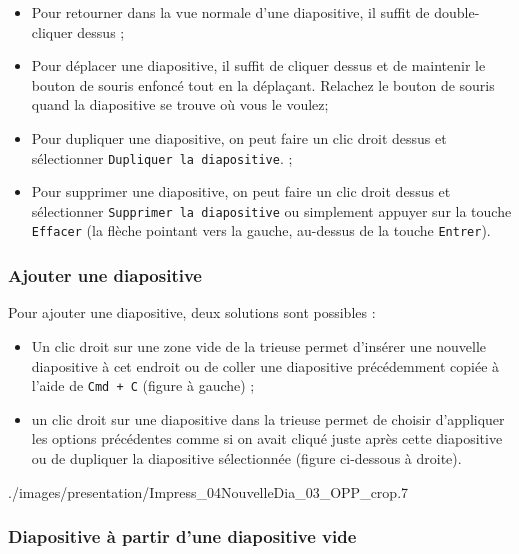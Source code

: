 
\begin{itemize}
	\item Pour retourner dans la vue normale d'une diapositive, il suffit de double-cliquer dessus ;
	\item Pour déplacer une diapositive, il suffit de cliquer dessus et de maintenir le bouton de souris enfoncé tout en la déplaçant. Relachez le bouton de souris quand la diapositive se trouve où vous le voulez;
	\item Pour dupliquer une diapositive, on peut faire un clic droit dessus et sélectionner \texttt{Dupliquer la diapositive}. ;
	\item Pour supprimer une diapositive, on peut faire un clic droit dessus et sélectionner \texttt{Supprimer la diapositive} ou simplement appuyer sur la touche \texttt{Effacer} (la flèche pointant vers la gauche, au-dessus de la touche \texttt{Entrer}).
\end{itemize}




\subsubsection{Ajouter une diapositive}\label{Presentation1nouvelleDiap}

Pour ajouter une diapositive, deux solutions sont possibles :

\begin{itemize}
\item Un clic droit sur une zone vide de la trieuse permet d'insérer une nouvelle diapositive à cet endroit ou de coller une diapositive précédemment copiée à l'aide de \texttt{Cmd + C} (figure à gauche) ; 
\item un clic droit sur une diapositive dans la trieuse permet de choisir d'appliquer les options précédentes comme si on avait cliqué juste après cette diapositive ou de dupliquer la diapositive sélectionnée (figure ci-dessous à droite).
\end{itemize}
	
	      {./images/presentation/Impress_04NouvelleDia_03_OPP_crop}{.7\textwidth}



\subsubsection{Diapositive à partir d'une diapositive vide}\label{Presentation1DiapoSansModele}


